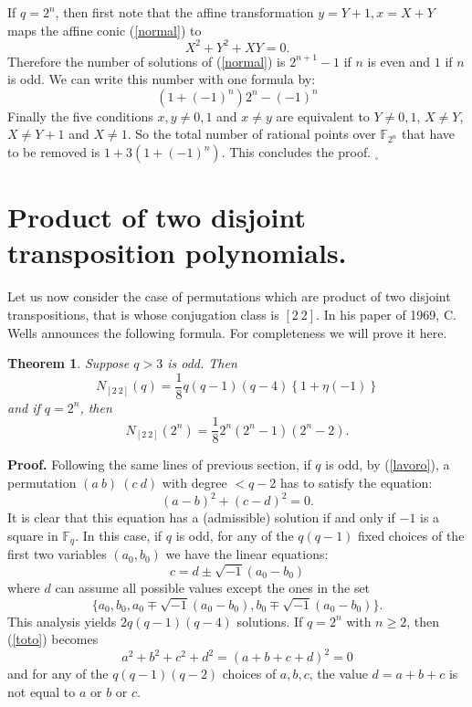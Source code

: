 \documentclass[10pt,a4paper,twoside]{article}
\def\Fq{{\mathbb{F}}_q}
\newtheorem{theorem}{Theorem}[section]
\begin{document}
If $q=2^n$, then first note that the affine transformation $y=Y+1, x=X+Y$ maps the
affine conic (\ref{normal}) to
$$X^2+Y^2+X Y=0.$$
Therefore the number of solutions of (\ref{normal}) is $2^{n+1}-1$ if $n$ is
even and $1$
if $n$ is odd. We can write this number with one formula
by:
$$(1+(-1)^n)2^n-(-1)^n$$
Finally the five conditions $x,y\neq0,1$ and $x\neq y$ are equivalent to
$Y\neq 0,1$, $X\neq Y$, $X\neq Y+1$ and $X\neq 1$.
So the total number of rational points over $\mathbb F_{2^n}$
that have to be removed is $1+3(1+(-1)^n)$.
This concludes the proof.
\bigskip\hfill $_\square$\bigskip

\section{Product of two disjoint transposition polynomials.}

Let us now consider the case of permutations which are product of two disjoint
transpositions,
that is whose conjugation class is $[2\ 2]$. In his paper of 1969, C. Wells announces
the following formula. For completeness we will prove it here.

\begin{theorem} Suppose $q>3$ is odd. Then
\begin{equation}\label{22}
N_{[2\ 2]}(q)=\frac{1}{8}q(q-1)(q-4)\left\{1+\eta(-1)\right\}
\end{equation}
and if $q=2^n$, then
$$N_{[2\ 2]}(2^n)=\frac{1}{8}2^{n}(2^n-1)(2^{n}-2).$$
\end{theorem}

\noindent\textbf{Proof.}  Following the same lines of previous section, if $q$ is odd,
 by (\ref{lavoro}), a permutation $(a\ b)\ (c\ d)$ with degree  $< q-2$
has to satisfy the equation:
\begin{equation}\label{toto}
(a-b)^2+(c-d)^2=0.
\end{equation}
It is clear that this equation has a (admissible) solution if and only if $-1$
is a square
in $\Fq$. In this case, if $q$ is odd, for any of the $q(q-1)$ fixed choices
of the first two variables $(a_0,b_0)$ we have the linear equations:
$$c=d\pm\sqrt{-1}(a_0-b_0)$$
where $d$ can assume all possible values except the ones in the set
$$\{a_0,b_0,a_0\mp\sqrt{-1}(a_0-b_0),b_0\mp\sqrt{-1}(a_0-b_0)\}.$$
This analysis yields $2q(q-1)(q-4)$ solutions.
If $q=2^n$ with $n\geq2$, then (\ref{toto}) becomes
$$a^2+b^2+c^2+d^2=(a+b+c+d)^2=0$$
and for any of the $q(q-1)(q-2)$ choices of $a, b, c$, the value $d=a+b+c$
is not equal to $a$ or $b$ or $c$.
\end{document}
